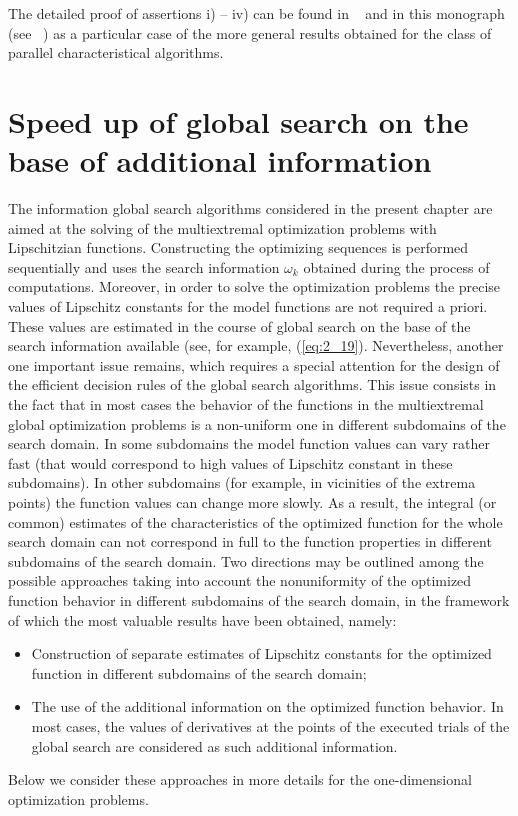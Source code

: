 The detailed proof of assertions i) – iv) can be found in ~\cite{2_GrishaginSergeyevStrongin} and in this monograph (see ~\cite{2_GriSergChap3}) as a particular case of the more general results obtained for the class of parallel characteristical algorithms.

\section{Speed up of global search on the base of additional information}
\label{sec:2_4}
The information global search algorithms considered in the present chapter are aimed at the solving of the multiextremal optimization problems with Lipschitzian functions. Constructing the optimizing sequences is performed sequentially and uses the search information $\omega_k$ obtained during the process of computations. Moreover, in order to solve the optimization problems the precise values of Lipschitz constants for the model functions are not required a priori. These values are estimated in the course of global search on the base of the search information available (see, for example, (\ref{eq:2_19}).
Nevertheless, another one important issue remains, which requires a special attention for the design of the efficient decision rules of the global search algorithms. This issue consists in the fact that in most cases the behavior of the functions in the multiextremal global optimization problems is a non-uniform one in different subdomains of the search domain. In some subdomains the model function values can vary rather fast (that would correspond to high values of Lipschitz constant in these subdomains). In other subdomains (for example, in  vicinities of the extrema points) the function values can change more slowly. As a result, the integral (or common) estimates of the characteristics of the optimized function for the whole search domain can not correspond in full to the function properties in different subdomains of the search domain.
Two directions may be outlined among the possible approaches taking into account the nonuniformity of the optimized function behavior in different subdomains of the search domain, in the framework of which the most valuable results have been obtained, namely:
\begin{itemize}
\item 
Construction of separate estimates of Lipschitz constants for the optimized function in different subdomains of the search domain;
\item 
The use of the additional information on the optimized function behavior. In most cases, the values of derivatives at the points of the executed trials of the global search are considered as such additional information.
 \end{itemize}
Below we consider these approaches  in more details for the one-dimensional optimization problems. 

